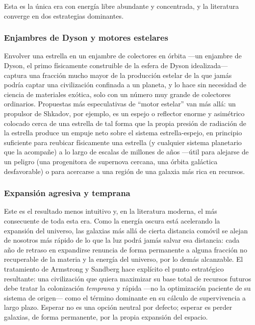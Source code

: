 \documentclass[11pt]{article}
\begin{document}
Esta es la única era con energía libre abundante y concentrada, y la literatura converge en dos estrategias dominantes.

\subsubsection{Enjambres de Dyson y motores estelares}

Envolver una estrella en un enjambre de colectores en órbita —un enjambre de Dyson, el primo físicamente construible de la esfera de Dyson idealizada— captura una fracción mucho mayor de la producción estelar de la que jamás podría captar una civilización confinada a un planeta, y lo hace sin necesidad de ciencia de materiales exótica, solo con un número muy grande de colectores ordinarios. Propuestas más especulativas de ``motor estelar'' van más allá: un propulsor de Shkadov, por ejemplo, es un espejo o reflector enorme y asimétrico colocado cerca de una estrella de tal forma que la propia presión de radiación de la estrella produce un empuje neto sobre el sistema estrella-espejo, en principio suficiente para reubicar físicamente una estrella (y cualquier sistema planetario que la acompañe) a lo largo de escalas de millones de años —útil para alejarse de un peligro (una progenitora de supernova cercana, una órbita galáctica desfavorable) o para acercarse a una región de una galaxia más rica en recursos.

\subsubsection{Expansión agresiva y temprana}

Este es el resultado menos intuitivo y, en la literatura moderna, el más consecuente de toda esta era. Como la energía oscura está acelerando la expansión del universo, las galaxias más allá de cierta distancia comóvil se alejan de nosotros más rápido de lo que la luz podrá jamás salvar esa distancia: cada año de retraso en expandirse renuncia de forma permanente a alguna fracción no recuperable de la materia y la energía del universo, por lo demás alcanzable. El tratamiento de Armstrong y Sandberg \citep{armstrong2013eternity} hace explícito el punto estratégico resultante: una civilización que quiera maximizar su base total de recursos futuros debe tratar la colonización \emph{temprana} y rápida —no la optimización paciente de su sistema de origen— como el término dominante en su cálculo de supervivencia a largo plazo. Esperar no es una opción neutral por defecto; esperar es perder galaxias, de forma permanente, por la propia expansión del espacio.
\end{document}
